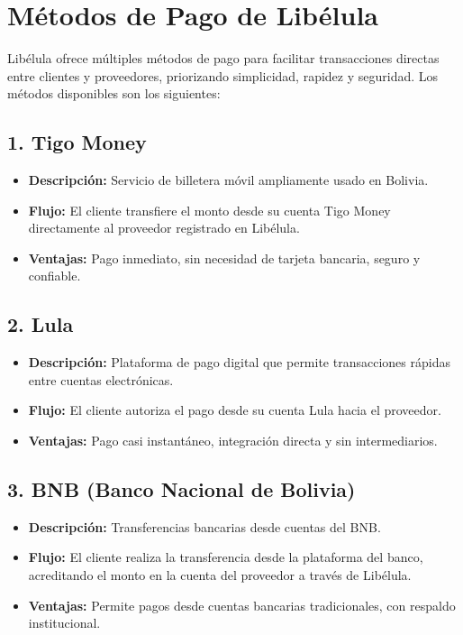\section*{Métodos de Pago de Libélula}
    Libélula ofrece múltiples métodos de pago para facilitar transacciones directas entre clientes y proveedores, priorizando simplicidad, rapidez y seguridad. Los métodos disponibles son los siguientes:

\subsection*{1. Tigo Money}
\begin{itemize}
	\item \textbf{Descripción:} Servicio de billetera móvil ampliamente usado en Bolivia.
	\item \textbf{Flujo:} El cliente transfiere el monto desde su cuenta Tigo Money directamente al proveedor registrado en Libélula.
	\item \textbf{Ventajas:} Pago inmediato, sin necesidad de tarjeta bancaria, seguro y confiable.
\end{itemize}

\subsection*{2. Lula}
\begin{itemize}
	\item \textbf{Descripción:} Plataforma de pago digital que permite transacciones rápidas entre cuentas electrónicas.
	\item \textbf{Flujo:} El cliente autoriza el pago desde su cuenta Lula hacia el proveedor.
	\item \textbf{Ventajas:} Pago casi instantáneo, integración directa y sin intermediarios.
\end{itemize}

\subsection*{3. BNB (Banco Nacional de Bolivia)}
\begin{itemize}
	\item \textbf{Descripción:} Transferencias bancarias desde cuentas del BNB.
	\item \textbf{Flujo:} El cliente realiza la transferencia desde la plataforma del banco, acreditando el monto en la cuenta del proveedor a través de Libélula.
	\item \textbf{Ventajas:} Permite pagos desde cuentas bancarias tradicionales, con respaldo institucional.
\end{itemize}

